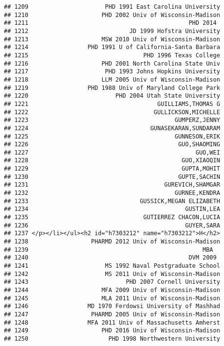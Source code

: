 \documentclass[
]{article}
\begin{document}
\begin{verbatim}
## 1209                      PHD 1991 East Carolina University
## 1210                     PHD 2002 Univ of Wisconsin-Madison
## 1211                                              PHD 2014 
## 1212                             JD 1999 Hofstra University
## 1213                     MSW 2010 Univ of Wisconsin-Madison
## 1214                 PHD 1991 U of California-Santa Barbara
## 1215                                 PHD 1996 Texas College
## 1216                     PHD 2001 North Carolina State Univ
## 1217                      PHD 1993 Johns Hopkins University
## 1218                     LLM 2005 Univ of Wisconsin-Madison
## 1219                 PHD 1988 Univ of Maryland College Park
## 1220                         PHD 2004 Utah State University
## 1221                                     GUILLIAMS,THOMAS G
## 1222                                    GULLICKSON,MICHELLE
## 1223                                          GUMPERZ,JENNY
## 1224                                   GUNASEKARAN,SUNDARAM
## 1225                                          GUNNESON,ERIK
## 1226                                           GUO,SHAOMING
## 1227                                                GUO,WEI
## 1228                                            GUO,XIAOQIN
## 1229                                            GUPTA,MOHIT
## 1230                                           GUPTE,SACHIN
## 1231                                       GUREVICH,SHAMGAR
## 1232                                          GURNEE,KENDRA
## 1233                                GUSSICK,MEGAN ELIZABETH
## 1234                                             GUSTIN,LEA
## 1235                                 GUTIERREZ CHACON,LUCIA
## 1236                                             GUYER,SARA
## 1237 </p></li></ul><h2 id="h7303212" name="h7303212">H</h2>
## 1238                  PHARMD 2012 Univ of Wisconsin-Madison
## 1239                                                  MBA  
## 1240                                              DVM 2009 
## 1241                      MS 1992 Naval Postgraduate School
## 1242                      MS 2011 Univ of Wisconsin-Madison
## 1243                            PHD 2007 Cornell University
## 1244                     MFA 2009 Univ of Wisconsin-Madison
## 1245                     MLA 2011 Univ of Wisconsin-Madison
## 1246                 MD 1970 Ferdowsi University of Mashhad
## 1247                  PHARMD 2005 Univ of Wisconsin-Madison
## 1248                 MFA 2011 Univ of Massachusetts Amherst
## 1249                     PHD 2016 Univ of Wisconsin-Madison
## 1250                       PHD 1998 Northwestern University

\end{verbatim}
\end{document}
